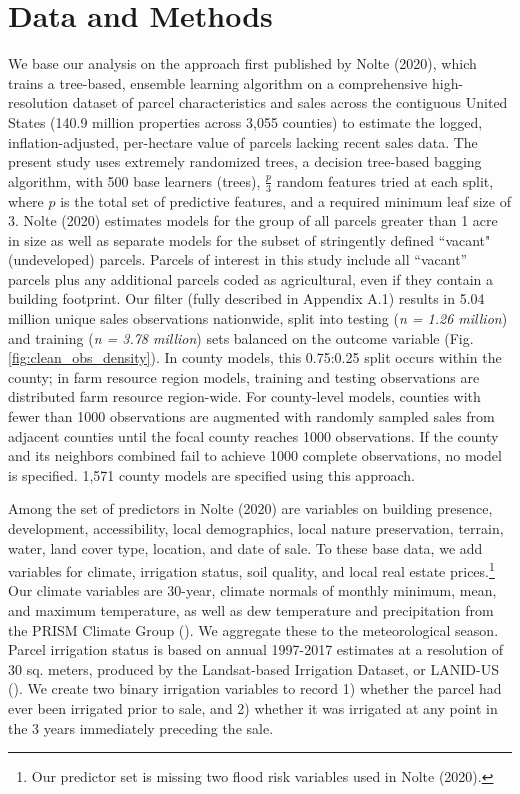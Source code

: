 \documentclass[12pt]{article}
\begin{document}
\section{Data and Methods}
We base our analysis on the approach first published by Nolte (2020), which trains a tree-based, ensemble learning algorithm on a comprehensive high-resolution dataset of parcel characteristics and sales across the contiguous United States (140.9 million properties across 3,055 counties) to estimate the logged, inflation-adjusted, per-hectare value of parcels lacking recent sales data. The present study uses extremely randomized trees, a decision tree-based bagging algorithm, with 500 base learners (trees), $\frac{p}{3}$ random features tried at each split, where $p$ is the total set of predictive features, and a required minimum leaf size of 3. Nolte (2020) estimates models for the group of all parcels greater than 1 acre in size as well as separate models for the subset of stringently defined ``vacant" (undeveloped) parcels. Parcels of interest in this study include all ``vacant'' parcels plus any additional parcels coded as agricultural, even if they contain a building footprint. Our filter (fully described in Appendix A.1) results in 5.04 million unique sales observations nationwide, split into testing (\textit{n = 1.26 million}) and training (\textit{n = 3.78 million}) sets balanced on the outcome variable (Fig. \ref{fig:clean_obs_density}). In county models, this 0.75:0.25 split occurs within the county; in farm resource region models, training and testing observations are distributed farm resource region-wide. For county-level models, counties with fewer than 1000 observations are augmented with randomly sampled sales from adjacent counties until the focal county reaches 1000 observations. If the county and its neighbors combined fail to achieve 1000 complete observations, no model is specified. 1,571 county models are specified using this approach.

Among the set of predictors in Nolte (2020) are variables on building presence, development, accessibility, local demographics, local nature preservation, terrain, water, land cover type, location, and date of sale. To these base data, we add variables for climate, irrigation status, soil quality, and local real estate prices.\footnote{Our predictor set is missing two flood risk variables used in Nolte (2020).} Our climate variables are 30-year, climate normals of monthly minimum, mean, and maximum temperature, as well as dew temperature and precipitation from the PRISM Climate Group (\cite{PRISMClimate2021}). We aggregate these to the meteorological season. Parcel irrigation status is based on annual 1997-2017 estimates at a resolution of 30 sq. meters, produced by the Landsat-based Irrigation Dataset, or LANID-US (\cite{Xie2021MappingStates}). We create two binary irrigation variables to record 1) whether the parcel had ever been irrigated prior to sale, and 2) whether it was irrigated at any point in the 3 years immediately preceding the sale. 
\end{document}
